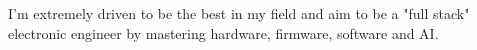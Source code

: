 

\begin{cvparagraph}

I’m extremely driven to be the best in my field and aim to be a "full stack" electronic engineer by mastering hardware, firmware, software and AI.
\end{cvparagraph}